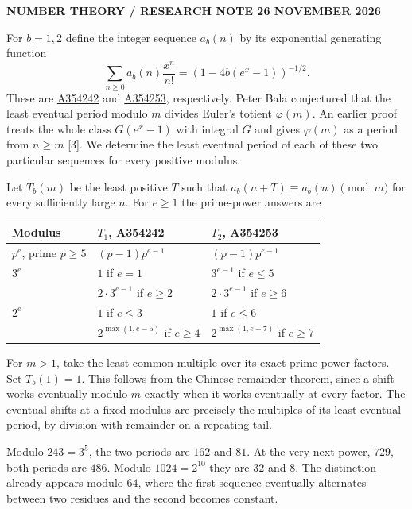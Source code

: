 \documentclass[11pt,letterpaper]{article}
\newcommand{\head}[1]{\vspace{6pt}{\large\sffamily\bfseries\color{ink}#1}\par}
\newcommand{\overlinehead}[1]{{\footnotesize\sffamily\bfseries\color{accent}#1}\par}
\newcommand{\oeis}[1]{\href{https://oeis.org/#1}{#1}}
\begin{document}
\overlinehead{NUMBER THEORY \quad / \quad RESEARCH NOTE \hfill 26 NOVEMBER 2026}
\par
For $b=1,2$ define the integer sequence $a_b(n)$ by its exponential generating function
\[
 \sum_{n\ge0} a_b(n)\frac{x^n}{n!}=(1-4b(e^x-1))^{-1/2}.
\]
These are \oeis{A354242} and \oeis{A354253}, respectively. Peter Bala conjectured that the least eventual period modulo $m$ divides Euler's totient $\varphi(m)$. An earlier proof treats the whole class $G(e^x-1)$ with integral $G$ and gives $\varphi(m)$ as a period from $n\ge m$ [3]. We determine the least eventual period of each of these two particular sequences for every positive modulus.

\head{The exact answer}
Let $T_b(m)$ be the least positive $T$ such that $a_b(n+T)\equiv a_b(n)\pmod m$ for every sufficiently large $n$. For $e\ge1$ the prime-power answers are
\begin{center}\renewcommand{\arraystretch}{1.33}
\begin{tabular}{@{}lll@{}}\toprule
\textbf{Modulus} & \textbf{$T_1$, A354242}& \textbf{$T_2$, A354253}\\\midrule
$p^e$, prime $p\ge5$ & $(p-1)p^{e-1}$ & $(p-1)p^{e-1}$\\
$3^e$ & $1$ if $e=1$ & $3^{e-1}$ if $e\le5$\\
 & $2\cdot3^{e-1}$ if $e\ge2$ & $2\cdot3^{e-1}$ if $e\ge6$\\
$2^e$ & $1$ if $e\le3$ & $1$ if $e\le6$\\
 & $2^{\max(1,e-5)}$ if $e\ge4$ & $2^{\max(1,e-7)}$ if $e\ge7$\\\bottomrule
\end{tabular}\end{center}
For $m>1$, take the least common multiple over its exact prime-power factors. Set $T_b(1)=1$. This follows from the Chinese remainder theorem, since a shift works eventually modulo $m$ exactly when it works eventually at every factor. The eventual shifts at a fixed modulus are precisely the multiples of its least eventual period, by division with remainder on a repeating tail.

\head{Two examples}
Modulo $243=3^5$, the two periods are $162$ and $81$. At the very next power, $729$, both periods are $486$. Modulo $1024=2^{10}$ they are $32$ and $8$. The distinction already appears modulo $64$, where the first sequence eventually alternates between two residues and the second becomes constant.
\end{document}
